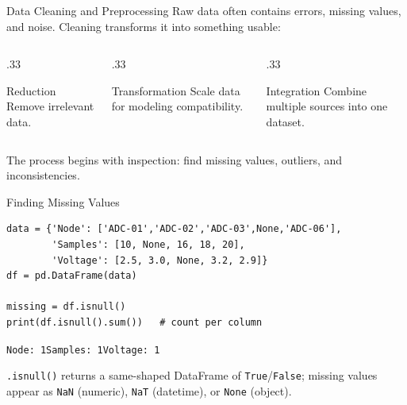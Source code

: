 \documentclass[9pt,aspectratio=169,xcolor=table]{beamer}
\begin{document}
\begin{frame}{Data Cleaning and Preprocessing}
    \leavevmode
    Raw data often contains errors, missing values, and noise. Cleaning
    transforms it into something usable:

    \vspace{2mm}
    \begin{columns}[t]
        \begin{column}{.33\textwidth}
            \begin{block}{Reduction}
                \scriptsize Remove irrelevant data.
            \end{block}
        \end{column}
        \begin{column}{.33\textwidth}
            \begin{block}{Transformation}
                \scriptsize Scale data for modeling compatibility.
            \end{block}
        \end{column}
        \begin{column}{.33\textwidth}
            \begin{block}{Integration}
                \scriptsize Combine multiple sources into one dataset.
            \end{block}
        \end{column}
    \end{columns}

    \vspace{3mm}
    {\small The process begins with \alert{inspection}: find missing
    values, outliers, and inconsistencies.}
\end{frame}

\begin{frame}[fragile]{Finding Missing Values}
    \leavevmode
\begin{lstlisting}
data = {'Node': ['ADC-01','ADC-02','ADC-03',None,'ADC-06'],
        'Samples': [10, None, 16, 18, 20],
        'Voltage': [2.5, 3.0, None, 3.2, 2.9]}
df = pd.DataFrame(data)

missing = df.isnull()
print(df.isnull().sum())   # count per column
\end{lstlisting}
    \texttt{Node: 1\quad Samples: 1\quad Voltage: 1}

    \vspace{2mm}
    {\small \texttt{.isnull()} returns a same-shaped DataFrame of
    \texttt{True}/\texttt{False}; missing values appear as \texttt{NaN}
    (numeric), \texttt{NaT} (datetime), or \texttt{None} (object).}
\end{frame}
\end{document}
